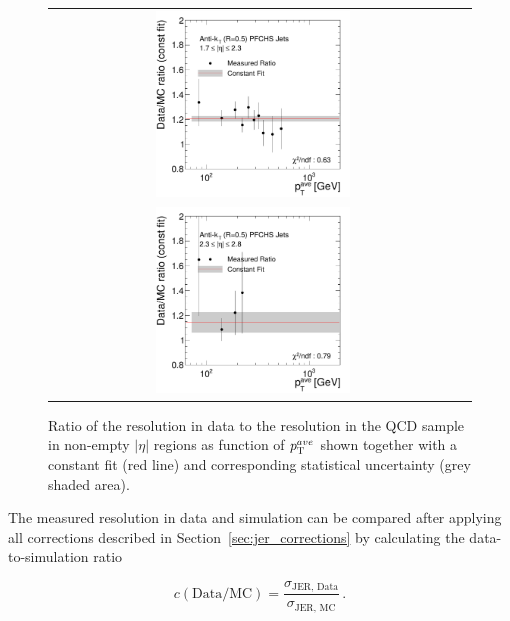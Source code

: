 \begin{figure}[!htp]
\begin{tabular}{cc}
                \includegraphics[width=0.49\textwidth]{figures/ExtrapolRatio_Eta3_with_pli_final_nominal_v4.pdf} \\
                \includegraphics[width=0.49\textwidth]{figures/ExtrapolRatio_Eta4_with_pli_final_nominal_v4.pdf}
  \end{tabular}
  \caption{Ratio of the resolution in data to the resolution in the QCD sample in non-empty $|\eta|$ regions as function of $p_{\text{T}}^{ave}$ shown together with a constant fit (red line) and corresponding statistical uncertainty (grey shaded area).}
  \label{fig:ratio}
\end{figure}
The measured resolution in data and simulation can be compared after applying all corrections described in Section~\ref{sec:jer_corrections} by calculating the data-to-simulation ratio

\begin{equation}
  c(\mathrm{Data}/\mathrm{MC}) = \frac{ \sigma_\mathrm{JER,\, Data}}{ \sigma_\mathrm{JER,\, MC}} \, .
 \end{equation}

